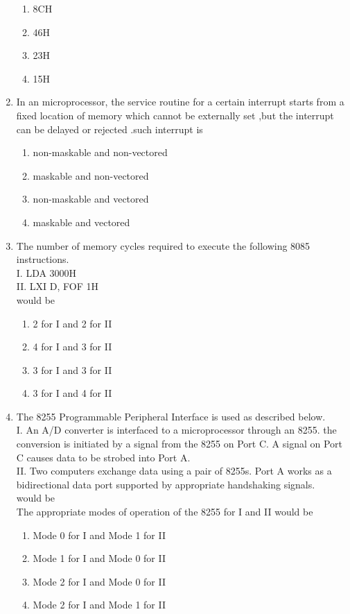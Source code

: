 \documentclass[journal,12pt,twocolumn]{IEEEtran}
\begin{document}
\begin{enumerate}
\begin{enumerate} 
      \item 8CH
      \item 46H
      \item 23H
      \item 15H
    \end{enumerate}
 \item In an microprocessor, the service routine for a certain interrupt  starts from a fixed location of memory which cannot be externally set ,but the interrupt can be delayed or rejected .such interrupt is
\begin{enumerate}
      \item non-maskable  and non-vectored
      \item maskable and non-vectored
      \item non-maskable and vectored
      \item maskable and vectored
    \end{enumerate}
\item The number of memory cycles required to execute the following 8085 instructions.\\
I. LDA 3000H\\
II. LXI D, FOF 1H\\
would be  \\
   \begin{enumerate}
      \item 2 for I and 2 for II
      \item 4 for I and 3 for II
      \item 3 for I and 3 for II
      \item 3 for I and 4 for II
    \end{enumerate}
\item The 8255 Programmable Peripheral Interface is used as described below.\\
I. An A/D converter is interfaced to a microprocessor through an 8255. the
conversion is initiated by a signal from the 8255 on Port C. A signal on Port C
causes data to be strobed into Port A.\\
II. Two computers exchange data using a pair of 8255s. Port A works as a bidirectional data port supported by appropriate handshaking signals.\\
would be  \\
The appropriate modes of operation of the 8255 for I and II would be\\
    \begin{enumerate}
      \item Mode 0 for I and Mode 1 for II
      \item Mode 1 for I and Mode 0 for II
      \item Mode 2 for I and Mode 0 for II
      \item Mode 2 for I and Mode 1 for II
    \end{enumerate}


\end{enumerate}
\end{document}
